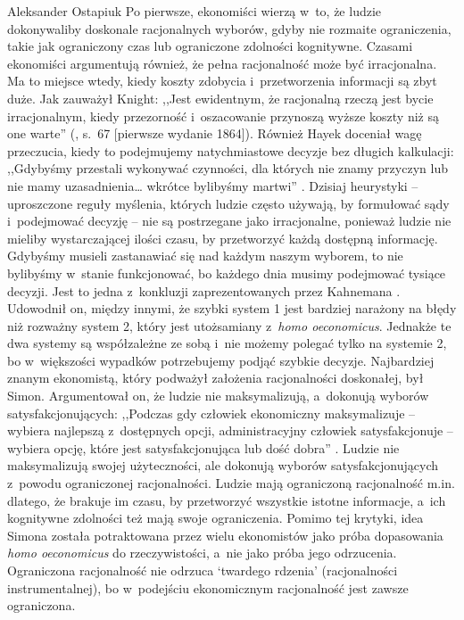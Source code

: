 \begin{artplenv}{Aleksander Ostapiuk}
Po pierwsze, ekonomiści wierzą w~to, że ludzie dokonywaliby doskonale racjonalnych wyborów, gdyby nie rozmaite
ograniczenia, takie jak ograniczony czas lub ograniczone zdolności kognitywne. Czasami ekonomiści argumentują również,
że pełna racjonalność może być irracjonalna. Ma to miejsce wtedy, kiedy koszty zdobycia i~przetworzenia informacji są
zbyt duże. Jak zauważył \mbox{Knight}: ,,Jest ewidentnym, że racjonalną rzeczą jest bycie irracjonalnym, kiedy
przezorność i~oszacowanie przynoszą wyższe koszty niż są one warte''
(\cite{knight_risk_1921}, s.~67 [pierwsze wydanie 1864]).
Również Hayek doceniał wagę przeczucia, kiedy to podejmujemy natychmiastowe decyzje bez długich
kalkulacji: ,,Gdybyśmy przestali wykonywać czynności, dla których nie znamy przyczyn lub nie mamy uzasadnienia… wkrótce
bylibyśmy martwi''
\parencite[s.~68]{hayek_fatal_1988}.
Dzisiaj heurystyki -- uproszczone reguły myślenia,
których ludzie często używają, by formułować sądy i~podejmować decyzję -- nie są postrzegane jako irracjonalne, ponieważ
ludzie nie mieliby wystarczającej ilości czasu, by przetworzyć każdą dostępną informację. Gdybyśmy musieli zastanawiać
się nad każdym naszym wyborem, to nie bylibyśmy w~stanie funkcjonować, bo każdego dnia musimy podejmować tysiące
decyzji. Jest to jedna z~konkluzji zaprezentowanych przez Kahnemana
\parencite{kahneman_pulapki_2012}.
Udowodnił on,
między innymi, że szybki system 1 jest bardziej narażony na błędy niż rozważny system 2, który jest
utożsamiany z~\textit{homo oeconomicus}. Jednakże te dwa systemy są współzależne ze sobą i~nie możemy
polegać tylko na systemie 2, bo
w~większości wypadków potrzebujemy podjąć szybkie decyzje. Najbardziej znanym ekonomistą, który podważył założenia
racjonalności doskonałej, był Simon. Argumentował on, że ludzie nie maksymalizują, a~dokonują wyborów
satysfakcjonujących: ,,Podczas gdy człowiek ekonomiczny maksymalizuje -- wybiera najlepszą z~dostępnych opcji,
administracyjny człowiek satysfakcjonuje -- wybiera opcję, które jest satysfakcjonująca lub dość dobra''
\parencite[s.~XXIX]{simon_administrative_1947}.
Ludzie nie maksymalizują swojej użyteczności, ale dokonują wyborów
satysfakcjonujących z~powodu ograniczonej racjonalności. Ludzie mają ograniczoną racjonalność m.in. dlatego, że
brakuje im czasu, by przetworzyć wszystkie istotne informacje, a~ich kognitywne zdolności też mają swoje ograniczenia.
Pomimo tej krytyki, idea Simona została potraktowana przez wielu ekonomistów jako próba dopasowania \textit{homo
oeconomicus} do rzeczywistości, a~nie jako próba jego odrzucenia. Ograniczona racjonalność nie odrzuca `twardego rdzenia'
(racjonalności instrumentalnej), bo w~podejściu ekonomicznym racjonalność jest zawsze ograniczona.


\end{artplenv}
